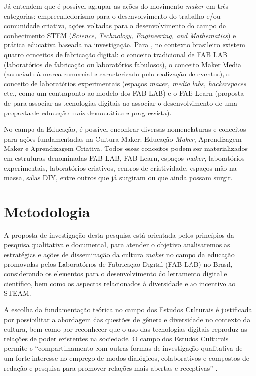 \documentclass[portuguese]{textolivre}
\begin{document}
Já \textcite{vossoughi_making_2015} entendem que é possível agrupar as ações do movimento \textit{maker} em três categorias: empreendedorismo para o desenvolvimento do trabalho e/ou comunidade criativa, ações voltadas para o desenvolvimento do campo do conhecimento STEM (\textit{Science, Technology, Engineering, and Mathematics}) e prática educativa baseada na investigação. Para \textcite{silva_perspectivas_2016}, no contexto brasileiro existem quatro conceitos de fabricação digital: o conceito tradicional de FAB LAB (laboratórios de fabricação ou laboratórios fabulosos), o conceito Maker Media (associado à marca comercial e caracterizado pela realização de eventos), o conceito de laboratórios experimentais (espaços \textit{maker, media labs, hackerspaces} etc., como um contraponto ao modelo dos FAB LAB) e o FAB Learn (proposta de \textcite{blikstein_viagens_2016} para associar as tecnologias digitais ao associar o desenvolvimento de uma proposta de educação mais democrática e progressista).

No campo da Educação, é possível encontrar diversas nomenclaturas e conceitos para ações fundamentadas na Cultura Maker: Educação \textit{Maker}, Aprendizagem Maker e Aprendizagem Criativa. Todos esses conceitos podem ser materializados em estruturas denominadas FAB LAB, FAB Learn, espaços \textit{maker}, laboratórios experimentais, laboratórios criativos, centros de criatividade, espaços mão-na-massa, salas DIY, entre outros que já surgiram ou que ainda possam surgir.

\section{Metodologia}\label{sec-conduta}
A proposta de investigação desta pesquisa está orientada pelos princípios da pesquisa qualitativa e documental, para atender o objetivo analisaremos as estratégias e ações de disseminação da cultura \textit{maker} no campo da educação promovidas pelos Laboratórios de Fabricação Digital (FAB LAB) no Brasil, considerando os elementos para o desenvolvimento do letramento digital e científico, bem como os aspectos relacionados à diversidade e ao incentivo ao STEAM.

A escolha da fundamentação teórica no campo dos Estudos Culturais \cite{hall_identidade_2006} é justificada por possibilitar a abordagem das questões de gênero e diversidade no contexto da cultura, bem como por reconhecer que o uso das tecnologias digitais reproduz as relações de poder existentes na sociedade. O campo dos Estudos Culturais permite o ``compartilhamento com outras formas de investigação qualitativa de um forte interesse no emprego de modos dialógicos, colaborativos e compostos de redação e pesquisa para promover relações mais abertas e receptivas'' \cite[p.~54]{denzin_o_2006}.
\end{document}

